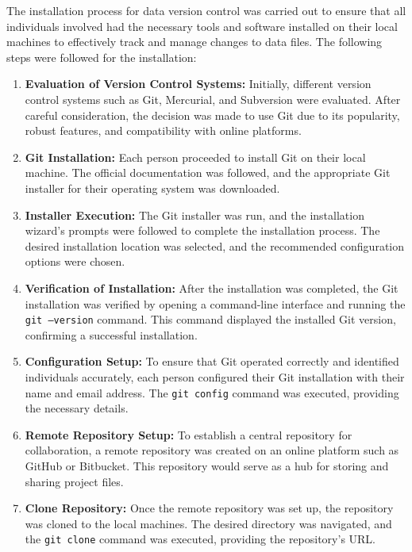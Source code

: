 The installation process for data version control was carried out to ensure that all individuals involved had the necessary tools and software installed on their local machines to effectively track and manage changes to data files. The following steps were followed for the installation:
	
	\begin{enumerate}[label=\textbf{\arabic*.}]
		\item \textbf{Evaluation of Version Control Systems:} Initially, different version control systems such as Git, Mercurial, and Subversion were evaluated. After careful consideration, the decision was made to use Git due to its popularity, robust features, and compatibility with online platforms.
		
		\item \textbf{Git Installation:} Each person proceeded to install Git on their local machine. The official documentation was followed, and the appropriate Git installer for their operating system was downloaded.
		
		\item \textbf{Installer Execution:} The Git installer was run, and the installation wizard's prompts were followed to complete the installation process. The desired installation location was selected, and the recommended configuration options were chosen.
		
		\item \textbf{Verification of Installation:} After the installation was completed, the Git installation was verified by opening a command-line interface and running the \texttt{git --version} command. This command displayed the installed Git version, confirming a successful installation.
		
		\item \textbf{Configuration Setup:} To ensure that Git operated correctly and identified individuals accurately, each person configured their Git installation with their name and email address. The \texttt{git config} command was executed, providing the necessary details.
		
		\item \textbf{Remote Repository Setup:} To establish a central repository for collaboration, a remote repository was created on an online platform such as GitHub or Bitbucket. This repository would serve as a hub for storing and sharing project files.
		
		\item \textbf{Clone Repository:} Once the remote repository was set up, the repository was cloned to the local machines. The desired directory was navigated, and the \texttt{git clone} command was executed, providing the repository's URL.
		

\end{enumerate}
